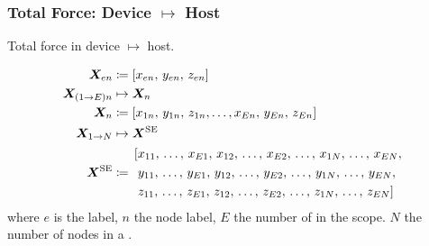 		\subsubsection{Total Force: Device $ \mapsto $ Host}
			\begin{algorithm}
				\caption{Total force in device $ \mapsto $ host.}
				\begin{algorithmic}[1]
						 
						 
							 
							\EndFor
						\EndFor
					\EndFunction
				\end{algorithmic}
			\end{algorithm}
	\begin{subequations}\label{e:fcne}
		\begin{align}
			\vec{X}_{en}			&\coloneqq	\left[x_{en},\, y_{en},\, z_{en}\right]\\
			\vec{X}_{(1\to E)n}		&\mapsto 	\vec{X}_{n} \nn
			\vec{X}_{n}				&\coloneqq	\left[x_{1n},\, y_{1n},\, z_{1n},\ldots,x_{En},\, y_{En},\, z_{En}\right]\label{se:xn_arr}\\
			\vec{X}_{1\to N}		&\mapsto	\vec{X}^{\textrm{SE}}\nn
			\vec{X}^{\textrm{SE}}	&\coloneqq 
			\begin{aligned}
				&\left[x_{11},\, \ldots,\, x_{E1},\, x_{12},\, \ldots,\, x_{E2},\, \ldots,\, x_{1N},\, \ldots,\, x_{EN}, \right.\\
				&\left.\,y_{11},\, \ldots,\, y_{E1},\, y_{12},\, \ldots,\, y_{E2},\, \ldots,\, y_{1N},\, \ldots,\, y_{EN}, \right.\\
				&\left.\,z_{11},\, \ldots,\, z_{E1},\, z_{12},\, \ldots,\, z_{E2},\, \ldots,\, z_{1N},\, \ldots,\, z_{EN}  \right]
			\end{aligned}
		\end{align}
	\end{subequations}
	where $ e $ is the  label, $ n $ the node label, $ E $ the number of  in the scope. $ N $ the number of nodes in a .
	
